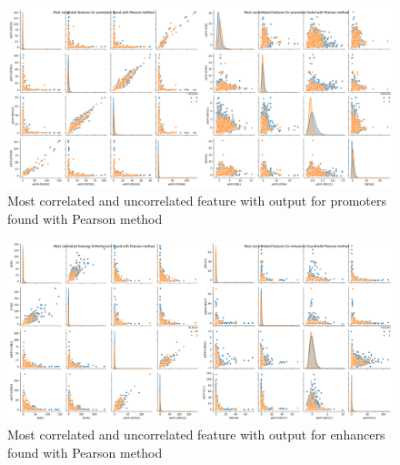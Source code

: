 \begin{figure}[h!]
\centering
\includegraphics[width=0.98\linewidth]{../images/plot_pearson_promoters_correlated_uncorrelated.png}
\caption{Most correlated and uncorrelated feature with output for promoters found with Pearson method}
\end{figure}
\newpage
\begin{figure}[h!]
\centering
\includegraphics[width=0.98\linewidth]{../images/plot_pearson_enhancers_correlated_uncorrelated.png}
\caption{Most correlated and uncorrelated feature with output for enhancers found with Pearson method}
\end{figure}

